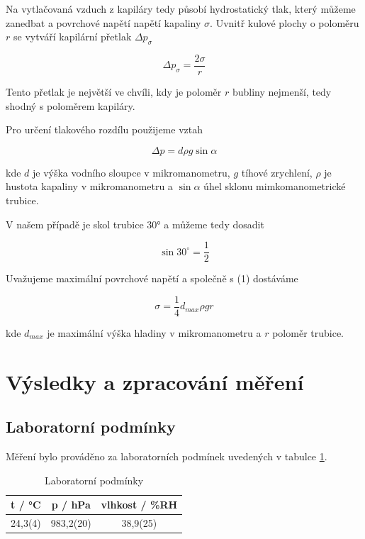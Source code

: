Na vytlačovaná vzduch z kapiláry tedy působí hydrostatický tlak, který můžeme zanedbat a povrchové napětí napětí kapaliny $\sigma$. Uvnitř kulové plochy o poloměru $r$ se vytváří kapilární přetlak $\Delta p_\sigma$

\begin{equation}
    \Delta p_\sigma = \frac{2\sigma}{r}
\end{equation}

Tento přetlak je největší ve chvíli, kdy je poloměr $r$ bubliny nejmenší, tedy shodný s poloměrem kapiláry.

Pro určení tlakového rozdílu použijeme vztah

\begin{equation}
    \Delta p = d \rho g \sin{\alpha}
\end{equation}

kde $d$ je výška vodního sloupce v mikromanometru, $g$ tíhové zrychlení, $\rho$ je hustota kapaliny v mikromanometru a $\sin{\alpha}$ úhel sklonu mimkomanometrické trubice.

V našem případě je skol trubice 30° a můžeme tedy dosadit

\begin{equation}
    \sin{30^{\circ}} = \frac{1}{2}
\end{equation}

Uvažujeme maximální povrchové napětí a společně s (1) dostáváme

\begin{equation}
    \sigma = \frac{1}{4} d_{max} \rho g r
\end{equation}

kde $d_{max}$ je maximální výška hladiny v mikromanometru a $r$ poloměr trubice.

\section{Výsledky a zpracování měření}

\subsection{Laboratorní podmínky}

    Měření bylo prováděno za laboratorních podmínek uvedených v tabulce \ref{tab:lab_pod}.

    \begin{table}[h]
        \centering
        \begin{tabular}{|c|c|c|} 
        \hline
            t / °C & p / hPa & vlhkost / \%RH  \\ 
        \hline
            24,3(4)   & 983,2(20)   & 38,9(25)            \\
        \hline
        \end{tabular}
        \caption{Laboratorní podmínky}
        \label{tab:lab_pod}
    \end{table}

